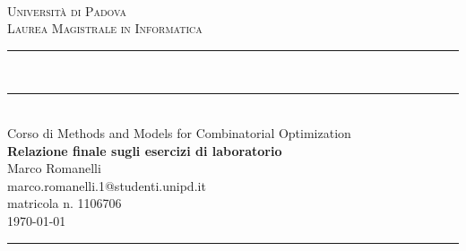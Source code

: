 \documentclass[fleqn,a4paper,11pt]{article}
\newcommand\HRule{\rule{\textwidth}{1pt}}
\newcommand\DRule{\rule{\textwidth}{.4pt}\\[\dimexpr-\baselineskip+1mm+2pt] \rule{\textwidth}{2pt}}
\begin{document}
\begin{titlepage}
\begin{center}
	\begin{minipage}{6in}
  		\centering
  		\hspace*{1.6in}
	\end{minipage}\\[1cm]
\textsc{\LARGE Universit\`a di Padova}\\[.2cm]
\textsc{\large Laurea Magistrale in Informatica}\\[.3cm]
\DRule \\[.5cm]
{\large Corso di Methods and Models for Combinatorial Optimization} \\[.4cm]
{\huge \bfseries Relazione finale sugli esercizi di laboratorio} \\[.4cm]
{\Large Marco Romanelli} \\[.2cm]
{\footnotesize marco.romanelli.1@studenti.unipd.it} \\
{\footnotesize matricola n. 1106706} \\[1cm]
{\large \today}
\HRule \\[3cm]
\end{center}
\end{titlepage}





		
	\clearpage
	\tableofcontents
	
	\clearpage
	


\end{document}
